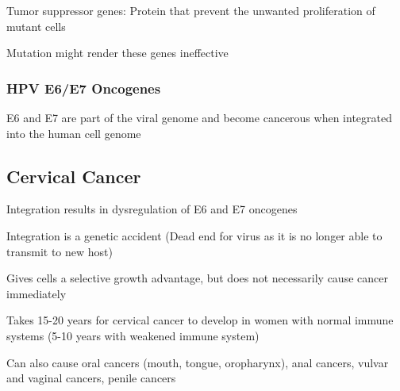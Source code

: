 \documentclass{notes}
\begin{document}
Tumor suppressor genes: Protein that prevent the unwanted proliferation of mutant cells

\tab Mutation might render these genes ineffective

\subsubsection{HPV E6/E7 Oncogenes}


E6 and E7 are part of the viral genome and become cancerous when integrated into the human cell genome

\subsection{Cervical Cancer}

Integration results in dysregulation of E6 and E7 oncogenes

\tab Integration is a genetic accident (Dead end for virus as it is no longer able to transmit to new host)

\tab Gives cells a selective growth advantage, but does not necessarily cause cancer immediately

Takes 15-20 years for cervical cancer to develop in women with normal immune systems (5-10 years with weakened immune system)

Can also cause oral cancers (mouth, tongue, oropharynx), anal cancers, vulvar and vaginal cancers, penile cancers
\end{document}
